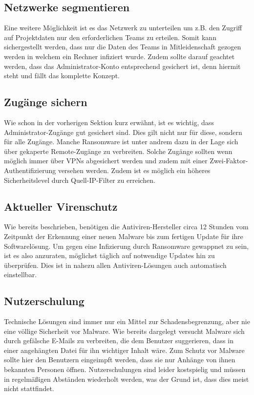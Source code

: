 \subsection{Netzwerke segmentieren}
	Eine weitere Möglichkeit ist es das Netzwerk zu unterteilen um z.B. den Zugriff auf Projektdaten nur den erforderlichen Teams zu erteilen. Somit kann sichergestellt werden, dass nur die Daten des Teams in Mitleidenschaft gezogen werden in welchem ein Rechner infiziert wurde. Zudem sollte darauf geachtet werden, dass das Administrator-Konto entsprechend gesichert ist, denn hiermit steht und fällt das komplette Konzept. \cite{bsi:ransome}
	
\subsection{Zugänge sichern}
	Wie schon in der vorherigen Sektion kurz erwähnt, ist es wichtig, dass Administrator-Zugänge gut gesichert sind. Dies gilt nicht nur für diese, sondern für alle Zugänge. Manche Ransomware ist unter andrem dazu in der Lage sich über gekaperte Remote-Zugänge zu verbreiten. Solche Zugänge sollten wenn möglich immer über VPNs abgesichert werden und zudem mit einer Zwei-Faktor-Authentifizierung versehen werden. Zudem ist es möglich ein höheres Sicherheitslevel durch Quell-IP-Filter zu erreichen. \cite{bsi:ransome}
	
\subsection{Aktueller Virenschutz}

	Wie bereits beschrieben, benötigen die Antiviren-Hersteller circa 12 Stunden vom Zeitpunkt der Erkennung einer neuen Malware bis zum fertigen Update für ihre Softwarelösung. Um gegen eine Infizierung durch Ransomware gewappnet zu sein, ist es also anzuraten, möglichst täglich auf notwendige Updates hin zu überprüfen. Dies ist in nahezu allen Antiviren-Lösungen auch automatisch einstellbar.

\subsection{Nutzerschulung}

	Technische Lösungen sind immer nur ein Mittel zur Schadensbegrenzung, aber nie eine völlige Sicherheit vor Malware. Wie bereits dargelegt versucht Malware sich durch gefälsche E-Mails zu verbreiten, die dem Benutzer suggerieren, dass in einer angehängten Datei für ihn wichtiger Inhalt wäre. Zum Schutz vor Malware sollte hier den Benutzern eingeimpft werden, dass sie nur Anhänge von ihnen bekannten Personen öffnen. Nutzerschulungen sind leider kostspielig und müssen in regelmäßigen Abständen wiederholt werden, was der Grund ist, dass dies meist nicht stattfindet.


